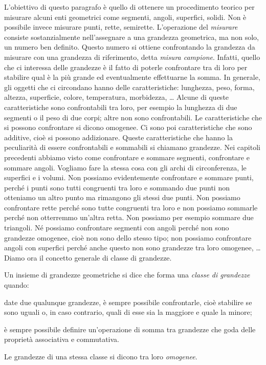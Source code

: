 L'obiettivo di questo paragrafo è quello di ottenere un procedimento 
teorico per misurare alcuni enti geometrici come segmenti, angoli, 
superfici, solidi. Non è possibile invece misurare punti, rette, 
semirette.
L'operazione del \emph{misurare} consiste sostanzialmente 
nell'assegnare a una grandezza geometrica, ma non solo, un numero ben 
definito. Questo numero si ottiene confrontando la grandezza da 
misurare con una grandezza di riferimento, detta \emph{misura 
campione}. Infatti, quello che ci interessa delle grandezze è il 
fatto di poterle confrontare tra di loro per stabilire qual è la più 
grande ed eventualmente effettuarne la somma.
In generale, gli oggetti che ci circondano hanno delle 
caratteristiche: lunghezza, peso, forma, altezza, superficie, colore, 
temperatura, morbidezza, \ldots{} Alcune di queste caratteristiche 
sono confrontabili tra loro, per esempio la lunghezza di due segmenti 
o il peso di due corpi; altre non sono confrontabili. Le 
caratteristiche che si possono confrontare si dicono omogenee. Ci 
sono poi caratteristiche che sono additive, cioè si possono 
addizionare. Queste caratteristiche che hanno la peculiarità di 
essere confrontabili e sommabili si chiamano grandezze.
Nei capitoli precedenti abbiamo visto come confrontare e sommare 
segmenti, confrontare e sommare angoli. Vogliamo fare la stessa cosa 
con gli archi di circonferenza, le superfici e i volumi.
Non possiamo evidentemente confrontare e sommare punti, perché i 
punti sono tutti congruenti tra loro e sommando due punti non 
otteniamo un altro punto ma rimangono gli stessi due punti. Non 
possiamo confrontare rette perché sono tutte congruenti tra loro e non 
possiamo sommarle perché non otterremmo un'altra retta. Non possiamo 
per esempio sommare due triangoli. Né possiamo confrontare segmenti 
con angoli perché non sono grandezze omogenee, cioè non sono dello 
stesso tipo; non possiamo confrontare angoli con superfici perché 
anche questo non sono grandezze tra loro omogenee, \ldots{}
Diamo ora il concetto generale di classe di grandezze.
\begin{definizione}
Un insieme di grandezze geometriche si dice che forma una 
\emph{classe di grandezze} quando:
\begin{itemize*}
\item date due qualunque grandezze, è sempre possibile confrontarle, 
cioè stabilire se sono uguali o, in caso contrario, quali di esse sia 
la maggiore e quale la minore;
\item è sempre possibile definire un'operazione di somma tra 
grandezze che goda delle proprietà associativa e commutativa.
\end{itemize*}
Le grandezze di una stessa classe si dicono tra loro \emph{omogenee}.
\end{definizione}


